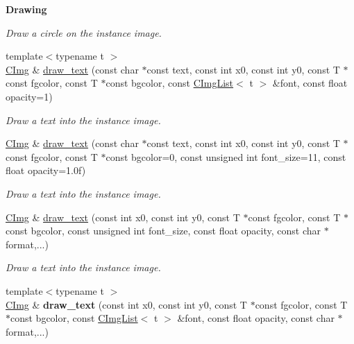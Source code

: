 \begin{Indent}{\bf Drawing}
\begin{DoxyCompactItemize}
\begin{DoxyCompactList}\small\item\em Draw a circle on the instance image. \item\end{DoxyCompactList}\item 
{\footnotesize template$<$typename t $>$ }\\\hyperlink{structcimg__library_1_1_c_img}{CImg} \& \hyperlink{structcimg__library_1_1_c_img_a405d7f71dad66f63bf13cc9485619db1}{draw\_\-text} (const char $\ast$const text, const int x0, const int y0, const T $\ast$const fgcolor, const T $\ast$const bgcolor, const \hyperlink{structcimg__library_1_1_c_img_list}{CImgList}$<$ t $>$ \&font, const float opacity=1)
\begin{DoxyCompactList}\small\item\em Draw a text into the instance image. \item\end{DoxyCompactList}\item 
\hyperlink{structcimg__library_1_1_c_img}{CImg} \& \hyperlink{structcimg__library_1_1_c_img_ac12c8f45e022ad0fa3bed46aee54ee48}{draw\_\-text} (const char $\ast$const text, const int x0, const int y0, const T $\ast$const fgcolor, const T $\ast$const bgcolor=0, const unsigned int font\_\-size=11, const float opacity=1.0f)
\begin{DoxyCompactList}\small\item\em Draw a text into the instance image. \item\end{DoxyCompactList}\item 
\hyperlink{structcimg__library_1_1_c_img}{CImg} \& \hyperlink{structcimg__library_1_1_c_img_ad5c3a182af6af463efe7769cbcb7b726}{draw\_\-text} (const int x0, const int y0, const T $\ast$const fgcolor, const T $\ast$const bgcolor, const unsigned int font\_\-size, const float opacity, const char $\ast$format,...)
\begin{DoxyCompactList}\small\item\em Draw a text into the instance image. \item\end{DoxyCompactList}\item 
\hypertarget{structcimg__library_1_1_c_img_af0248c30eede5ab16f8805a4a1795aa5}{
{\footnotesize template$<$typename t $>$ }\\\hyperlink{structcimg__library_1_1_c_img}{CImg} \& {\bfseries draw\_\-text} (const int x0, const int y0, const T $\ast$const fgcolor, const T $\ast$const bgcolor, const \hyperlink{structcimg__library_1_1_c_img_list}{CImgList}$<$ t $>$ \&font, const float opacity, const char $\ast$format,...)}
\label{structcimg__library_1_1_c_img_af0248c30eede5ab16f8805a4a1795aa5}


\end{DoxyCompactItemize}
\end{Indent}
